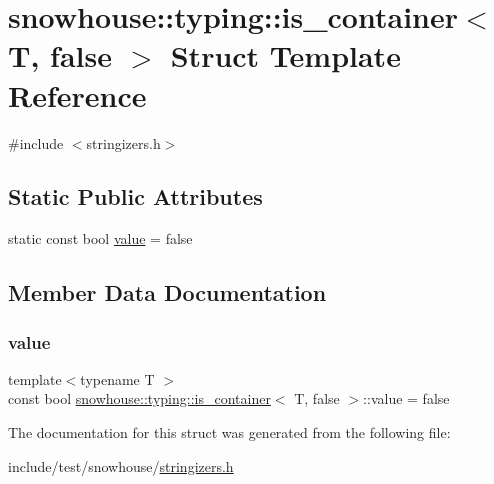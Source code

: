 \hypertarget{structsnowhouse_1_1typing_1_1is__container_3_01T_00_01false_01_4}{}\section{snowhouse\+::typing\+::is\+\_\+container$<$ T, false $>$ Struct Template Reference}
\label{structsnowhouse_1_1typing_1_1is__container_3_01T_00_01false_01_4}


{\ttfamily \#include $<$stringizers.\+h$>$}

\subsection*{Static Public Attributes}
\begin{DoxyCompactItemize}
\item 
static const bool \mbox{\hyperlink{structsnowhouse_1_1typing_1_1is__container_3_01T_00_01false_01_4_a620528653f5cc31cbc9025f2d97e6ed0}{value}} = false
\end{DoxyCompactItemize}


\subsection{Member Data Documentation}
\mbox{\label{structsnowhouse_1_1typing_1_1is__container_3_01T_00_01false_01_4_a620528653f5cc31cbc9025f2d97e6ed0}} 
\subsubsection{\texorpdfstring{value}{value}}
{\footnotesize\ttfamily template$<$typename T $>$ \\
const bool \mbox{\hyperlink{structsnowhouse_1_1typing_1_1is__container}{snowhouse\+::typing\+::is\+\_\+container}}$<$ T, false $>$\+::value = false\hspace{0.3cm}{\ttfamily [static]}}



The documentation for this struct was generated from the following file\+:\begin{DoxyCompactItemize}
\item 
include/test/snowhouse/\mbox{\hyperlink{stringizers_8h}{stringizers.\+h}}\end{DoxyCompactItemize}
